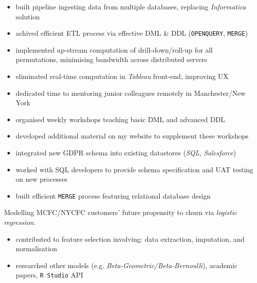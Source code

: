 \documentclass[letterpaper,11pt]{article}
\begin{document}
\begin{description}[style=multiline,leftmargin=3cm]
	      \begin{description}[style=multiline,leftmargin=2.5cm]
		      \item[Data Pipeline]
		            {
		            \begin{itemize}
			            \item built pipeline ingesting data from multiple databases, replacing \textit{Informatica} solution
			            \item achived efficient ETL process via effective DML \& DDL (\texttt{OPENQUERY}, \texttt{MERGE})
		            \end{itemize}
		            }
		      \item[Data Cubes]
		            {
		            \begin{itemize}
			            \item implemented up-stream computation of drill-down/roll-up for all permutations, minimising bandwidth across distributed servers
			            \item eliminated real-time computation in \textit{Tableau} front-end, improving UX
		            \end{itemize}
		            }
		      \item[Mentoring]
		            {
		            \begin{itemize}
			            \item dedicated time to mentoring junior colleagues remotely in Manchester/New York
			            \item organised weekly workshops teaching basic DML and advanced DDL
			            \item developed additional material on my website to supplement these workshops
		            \end{itemize}
		            }
	      \end{description}
	\item[GDPR Pipeline]
	      \begin{itemize}
		      \item integrated new GDPR schema into existing datastores (\textit{SQL}, \textit{Salesforce})
		      \item worked with SQL developers to provide schema specification and UAT testing on new processes
		      \item built efficient \texttt{MERGE} process featuring relational database design
	      \end{itemize}
	\item[Customer Churn Model]
	      Modelling MCFC/NYCFC customers' future propensity to churn via \textit{logistic regression}.
	      \begin{itemize}
		      \item contributed to feature selection involving: data extraction, imputation, and normalisation
		      \item researched other models (e.g. \textit{Beta-Geometric/Beta-Bernoulli}), academic papers, \texttt{R Studio} API
	      \end{itemize}
\end{description}
\end{document}
